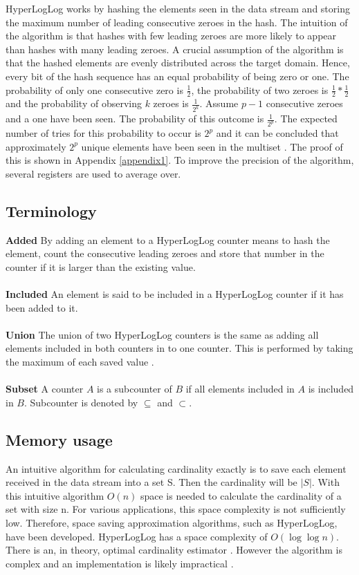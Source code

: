 HyperLogLog works by hashing the elements seen in the data stream and storing the maximum number of leading consecutive zeroes in the hash. The intuition of the algorithm is that hashes with few leading zeroes are more likely to appear than hashes with many leading zeroes. A crucial assumption of the algorithm is that the hashed elements are evenly distributed across the target domain. Hence, every bit of the hash sequence has an equal probability of being zero or one. The probability of only one consecutive zero is $\frac{1}{2}$, the probability of two zeroes is $\frac{1}{2}*\frac{1}{2}$ and the probability of observing $k$ zeroes is $\frac {1} {2^k}$. Assume $p-1$ consecutive zeroes and a one have been seen. The probability of this outcome is $\frac{1}{2^p}$. The expected number of tries for this probability to occur is $2^p$ and it can be concluded that approximately $2^p$ unique elements have been seen in the multiset \cite{hyperloglog}. The proof of this is shown in Appendix \ref{appendix1}. To improve the precision of the algorithm, several registers are used to average over. 

\subsection{Terminology}
\textbf{Added }
By adding an element to a HyperLogLog counter means to hash the element, count the consecutive leading zeroes and store that number in the counter if it is larger than the existing value.\\\\
\textbf{Included }
An element is said to be included in a HyperLogLog counter if it has been added to it.\\\\
\textbf{Union }
The union of two HyperLogLog counters is the same as adding all elements included in both counters in to one counter. This is performed by taking the maximum of each saved value \cite{hyperanf}.\\\\
\textbf{Subset }
A counter $A$ is a subcounter of $B$ if all elements included in $A$ is included in $B$. Subcounter is denoted by $\subseteq$ and $\subset$.

\subsection{Memory usage}
An intuitive algorithm for calculating cardinality exactly is to save each element received in the data stream into a set S. Then the cardinality will be $|S|$. With this intuitive algorithm $O(n)$ space is needed to calculate the cardinality of a set with size n. For various applications, this space complexity is not sufficiently low. Therefore, space saving approximation algorithms, such as HyperLogLog, have been developed. HyperLogLog has a space complexity of $O(\log\log n)$. There is an, in theory, optimal cardinality estimator \cite{optimal_cardinality}. However the algorithm is complex and an implementation is likely impractical \cite{google_hyperloglog}. 

